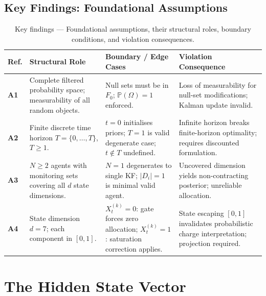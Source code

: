 \documentclass[12pt,openany]{book}
\newcommand{\Prob}{\mathbb{P}}
\newcommand{\calF}{\mathcal{F}}
\numberwithin{equation}{chapter}
\theoremstyle{plain}
\theoremstyle{definition}
\theoremstyle{remark}
\renewcommand{\arraystretch}{1.2}
\def\mathcal#1{#1}%
\begin{document}
\subsection*{Key Findings: Foundational Assumptions}

\begin{table}[H]
\centering
\caption{Key findings — Foundational assumptions, their
  structural roles, boundary conditions, and violation
  consequences.}
\label{tab:key-findings-assumptions}
\renewcommand{\arraystretch}{1.35}
\begin{tabularx}{\textwidth}{@{}
    >{\bfseries}p{}
    >{\RaggedRight}p{}
    >{\RaggedRight}p{}
    >{\RaggedRight}X
  @{}}
\toprule
Ref. & Structural Role & Boundary / Edge Cases
     & Violation Consequence \\
\midrule
A1 & Complete filtered probability space;
     measurability of all random objects.
   & Null sets must be in $\calF_0$;
     $\Prob(\Omega)=1$ enforced.
   & Loss of measurability for null-set
     modifications; Kalman update invalid. \\
\addlinespace
A2 & Finite discrete time horizon
     $\mathcal{T}=\{0,\ldots,T\}$,
     $T\geq 1$.
   & $t=0$ initialises priors;
     $T=1$ is valid degenerate case;
     $t\notin\mathcal{T}$ undefined.
   & Infinite horizon breaks finite-horizon
     optimality; requires discounted
     formulation. \\
\addlinespace
A3 & $N\geq 2$ agents with monitoring sets
     covering all $d$ state dimensions.
   & $N=1$ degenerates to single KF;
     $|\mathcal{D}_i|=1$ is minimal valid
     agent.
   & Uncovered dimension yields
     non-contracting posterior; unreliable
     allocation. \\
\addlinespace
A4 & State dimension $d=7$; each component
     in $[0,1]$.
   & $X_t^{(k)}=0$: gate forces zero
     allocation; $X_t^{(k)}=1$: saturation
     correction applies.
   & State escaping $[0,1]$ invalidates
     probabilistic charge interpretation;
     projection required. \\
\bottomrule
\end{tabularx}
\end{table}

\section{The Hidden State Vector}
\end{document}
